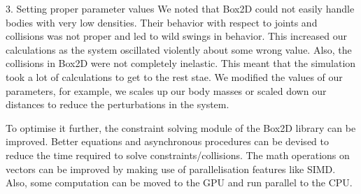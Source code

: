 \documentclass[a4paper,11pt]{article}
\begin{document}
3. Setting proper parameter values
We noted that Box2D could not easily handle bodies with very low densities. Their behavior with respect to joints and collisions was not proper and led to wild swings in behavior. This increased our calculations as the system oscillated violently about some wrong value. Also, the collisions in Box2D were not completely inelastic. This meant that the simulation took a lot of calculations to get to the rest stae. We modified the values of our parameters, for example, we scales up our body masses or scaled down our distances to reduce the perturbations in the system. 

To optimise it further, the constraint solving module of the Box2D library can be improved. Better equations and asynchronous procedures can be devised to reduce the time required to solve constraints/collisions. The math operations on vectors can be improved by making use of parallelisation features like SIMD. Also, some computation can be moved to the GPU and run parallel to the CPU.

\nocite{*}



\end{document}
